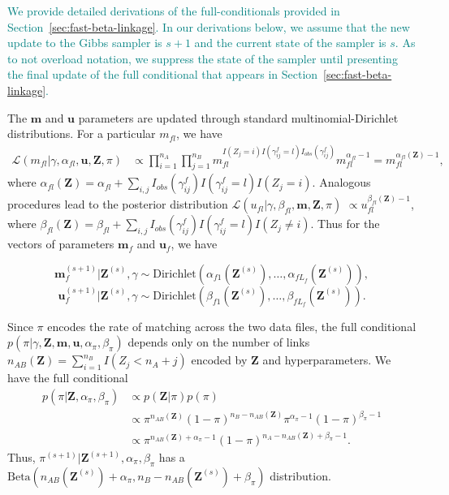 \documentclass[ba]{imsart}
\begin{document}
\textcolor{teal}{We provide detailed derivations of the full-conditionals provided in Section~\ref{sec:fast-beta-linkage}. In our derivations below, we assume that the new update to the Gibbs sampler is $s+1$ and the current state of the sampler is $s.$ As to not overload notation, we suppress the state of the sampler until presenting the final update of the full conditional that appears in Section~\ref{sec:fast-beta-linkage}.}

The $\bm{m}$ and $\bm{u}$ parameters are updated through standard multinomial-Dirichlet distributions. For a particular $m_{fl}$, we have
\begin{align*}
	\mathcal{L}(m_{fl}|\gamma, \alpha_{fl}, \bm{u}, \bm{Z}, \pi) &\propto \prod_{i=1}^{n_A} \prod_{j=1}^{n_B} m_{fl}^{I(Z_j = i) I(\gamma_{ij}^f = l) I_{obs}(\gamma_{ij}^f)}  m_{fl}^{\alpha_{fl} - 1} = m_{fl}^{\alpha_{fl}(\bm{Z}) - 1},
\end{align*}
where $\alpha_{fl}(\bm{Z})= \alpha_{fl} + \sum_{i,j} I_{obs}(\gamma_{ij}^f)I(\gamma_{ij}^f = l) I(Z_j = i)$. Analogous procedures lead to the posterior distribution $\mathcal{L}(u_{fl}| \gamma, \beta_{fl}, \bm{m}, \bm{Z}, \pi)$  $\propto u_{fl}^{\beta_{fl}(\bm{Z}) - 1}$, where $\beta_{fl}(\bm{Z})= \beta_{fl} + \sum_{i,j} I_{obs}(\gamma_{ij}^f)I(\gamma_{ij}^f = l) I(Z_j \neq i)$. Thus for the vectors of parameters $\bm{m}_f$ and $\bm{u}_f$, we have

$$\bm{m}_f^{(s+1)}|\bm{Z}^{(s)}, \gamma \sim \text{Dirichlet}(\alpha_{f1}(\bm{Z}^{(s)}), \ldots, \alpha_{fL_f}(\bm{Z}^{(s)})),$$
$$\bm{u}_f^{(s+1)}|\bm{Z}^{(s)}, \gamma \sim \text{Dirichlet}(\beta_{f1}(\bm{Z}^{(s)}), \ldots, \beta_{fL_f}(\bm{Z}^{(s)})).$$

Since $\pi$ encodes the rate of matching across the two data files, the full conditional $p(\pi|\gamma, \bm{Z}, \bm{m}, \bm{u}, \alpha_{\pi}, \beta_{\pi})$ depends only on the number of links $n_{AB}(\bm{Z}) = \sum_{i=1}^{n_B}I(Z_j < n_A + j)$ encoded by $\bm{Z}$ and hyperparameters. We have the full conditional
\begin{align*}
	p(\pi | \bm{Z}, \alpha_{\pi}, \beta_{\pi}) &\propto p(\bm{Z}|\pi)p(\pi) \\
	&\propto \pi^{n_{AB}(\bm{Z})} (1-\pi)^{n_B - n_{AB}(\bm{Z})} \pi^{\alpha_{\pi} -1} (1-\pi)^{\beta_{\pi} -1} \\
	&\propto \pi^{n_{AB}(\bm{Z}) + \alpha_{\pi} - 1} (1-\pi)^{n_A - n_{AB}(\bm{Z}) + \beta_{\pi} -1}.
\end{align*}
Thus, $\pi^{(s+1)}|\bm{Z}^{(s+1)},  \alpha_{\pi}, \beta_{\pi}$ has a $\text{Beta}(n_{AB}(\bm{Z}^{(s)}) + \alpha_{\pi}, n_B - n_{AB}(\bm{Z}^{(s)}) + \beta_{\pi})$ distribution.
\end{document}
